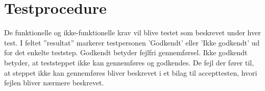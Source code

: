 \chapter{Testprocedure}\label{Testprocedure}

De funktionelle og ikke-funktionelle krav vil blive testet som beskrevet under hver test. I feltet ”resultat” markerer testpersonen 'Godkendt' eller 'Ikke godkendt' ud for det enkelte teststep. 
Godkendt betyder fejlfri gennemførsel. 
Ikke godkendt betyder, at teststeppet ikke kan gennemføres og godkendes. De fejl der fører til, at steppet ikke kan gennemføres bliver beskrevet i et bilag til accepttesten, hvori fejlen bliver nærmere beskrevet. 
\newpage